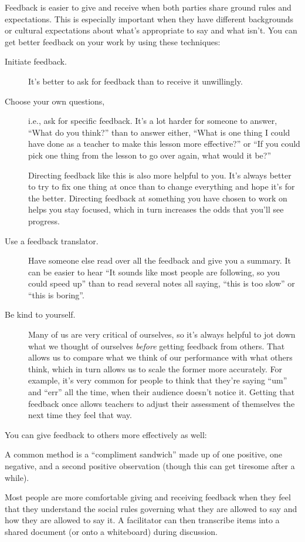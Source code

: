 Feedback is easier to give and receive when both parties share ground
rules and expectations. This is especially important when they have
different backgrounds or cultural expectations about what's appropriate
to say and what isn't. You can get better feedback on your work by using
these techniques:

\begin{description}
\item[Initiate feedback.]
It's better to ask for feedback than to receive it unwillingly.
\item[Choose your own questions,]
i.e., ask for specific feedback. It's a lot harder for someone to
answer, ``What do you think?'' than to answer either, ``What is one
thing I could have done as a teacher to make this lesson more
effective?'' or ``If you could pick one thing from the lesson to go
over again, what would it be?''

Directing feedback like this is also more helpful to you. It's
always better to try to fix one thing at once than to change
everything and hope it's for the better. Directing feedback at
something you have chosen to work on helps you stay focused, which
in turn increases the odds that you'll see progress.
\item[Use a feedback translator.]
Have someone else read over all the feedback and give you a summary.
It can be easier to hear ``It sounds like most people are following,
so you could speed up'' than to read several notes all saying, ``this
is too slow'' or ``this is boring''.
\item[Be kind to yourself.]
Many of us are very critical of ourselves, so it's always helpful to
jot down what we thought of ourselves \emph{before} getting feedback from
others. That allows us to compare what we think of our performance
with what others think, which in turn allows us to scale the former
more accurately. For example, it's very common for people to think
that they're saying ``um'' and ``err'' all the time, when their audience
doesn't notice it. Getting that feedback once allows teachers to
adjust their assessment of themselves the next time they feel that
way.
\end{description}

You can give feedback to others more effectively as well:

\begin{description}
\tightlist
\item[Balance positive and negative feedback.]
A common method is a ``compliment sandwich'' made up of one positive,
one negative, and a second positive observation (though this can get
tiresome after a while).
\item[Organize your feedback using a rubric.]
Most people are more comfortable giving and receiving feedback when
they feel that they understand the social rules governing what they
are allowed to say and how they are allowed to say it. A facilitator
can then transcribe items into a shared document (or onto a
whiteboard) during discussion.
\end{description}

